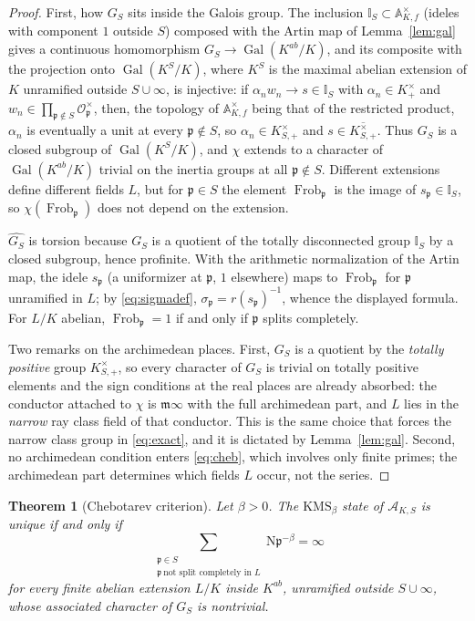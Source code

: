 \documentclass[11pt]{amsart}
\numberwithin{equation}{section}
\newtheorem{theorem}{Theorem}[section]
\theoremstyle{definition}
\theoremstyle{remark}
\newcommand{\A}{\mathbb{A}}
\newcommand{\Gal}{\operatorname{Gal}}
\newcommand{\Frob}{\operatorname{Frob}}
\newcommand{\Ns}{\mathrm{N}}
\newcommand{\cA}{\mathcal{A}}
\newcommand{\cO}{\mathcal{O}}
\newcommand{\Idl}{\mathbb{I}}
\newcommand{\pp}{\mathfrak{p}}
\newcommand{\mm}{\mathfrak{m}}
\begin{document}
\begin{proof}
First, how $G_S$ sits inside the Galois group. The inclusion $\Idl_S\subset\A_{K,f}^\times$
(ideles with component $1$ outside $S$) composed with the Artin map of Lemma~\ref{lem:gal}
gives a continuous homomorphism $G_S\to\Gal(K^{ab}/K)$, and its composite with the
projection onto $\Gal(K^{S}/K)$, where $K^{S}$ is the maximal abelian extension of $K$
unramified outside $S\cup\infty$, is injective: if $\alpha_nw_n\to s\in\Idl_S$ with
$\alpha_n\in K^\times_+$ and $w_n\in\prod_{\pp\notin S}\cO_\pp^\times$, then, the topology
of $\A_{K,f}^\times$ being that of the restricted product, $\alpha_n$ is eventually a unit at
every $\pp\notin S$, so $\alpha_n\in K^\times_{S,+}$ and $s\in\overline{K^\times_{S,+}}$.
Thus $G_S$ is a closed subgroup of $\Gal(K^{S}/K)$, and $\chi$ extends to a character of
$\Gal(K^{ab}/K)$ trivial on the inertia groups at all $\pp\notin S$. Different extensions
define different fields $L$, but for $\pp\in S$ the element $\Frob_\pp$ is the image of
$s_\pp\in\Idl_S$, so $\chi(\Frob_\pp)$ does not depend on the extension.

$\widehat{G_S}$ is torsion because $G_S$ is a quotient of the totally
disconnected group $\Idl_S$ by a closed subgroup, hence profinite. With the arithmetic
normalization of the Artin map, the idele $s_\pp$ (a uniformizer at $\pp$,
$1$ elsewhere) maps to $\Frob_\pp$ for $\pp$ unramified in $L$; by
\eqref{eq:sigmadef}, $\sigma_\pp=r(s_\pp)^{-1}$, whence the displayed formula.
For $L/K$ abelian, $\Frob_\pp=1$ if and only if $\pp$ splits completely.

Two remarks on the archimedean places. First, $G_S$ is a quotient by the \emph{totally
positive} group $K^\times_{S,+}$, so every character of $G_S$ is trivial on totally
positive elements and the sign conditions at the real places are already absorbed: the
conductor attached to $\chi$ is $\mm\infty$ with the full archimedean part, and $L$ lies
in the \emph{narrow} ray class field of that conductor. This is the same choice that
forces the narrow class group in \eqref{eq:exact}, and it is dictated by
Lemma~\ref{lem:gal}. Second, no archimedean condition enters \eqref{eq:cheb}, which
involves only finite primes; the archimedean part determines which fields $L$ occur, not
the series.
\end{proof}

\begin{theorem}[Chebotarev criterion]\label{thm:cheb}
Let $\beta>0$. The $\mathrm{KMS}_\beta$ state of $\cA_{K,S}$ is unique if and
only if
\begin{equation}\label{eq:cheb}
\sum_{\substack{\pp\in S\\ \pp\ \text{not split completely in }L}}\Ns\pp^{-\beta}=\infty
\end{equation}
for every finite abelian extension $L/K$ inside $K^{ab}$, unramified outside
$S\cup\infty$, whose associated character of $G_S$ is nontrivial.
\end{theorem}
\end{document}
